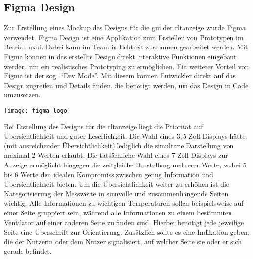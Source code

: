 \subsection{Figma Design}\label{figma_design}
\begin{minipage}{0.6\textwidth}
    Zur Erstellung eines Mockup des Designs für die \acs{gui} der \acs{rltanzeige} wurde Figma verwendet. Figma Design ist eine Applikation zum Erstellen von Prototypen im Bereich \ac{uxui}. Dabei kann im Team in Echtzeit zusammen gearbeitet werden. Mit Figma können in das erstellte Design direkt interaktive Funktionen eingebaut werden, um ein realistisches Prototyping zu ermöglichen. Ein weiterer Vorteil von Figma ist der sog. \enquote{Dev Mode}. Mit diesem können Entwickler direkt auf das Design zugreifen und Details finden, die benötigt werden, um das Design in Code umzusetzen. \cite[vgl.][]{figma_design:o.J.}
\end{minipage}%
\hfill
\begin{minipage}{0.37\textwidth}
	\centering	
	\texttt{[image: figma\_logo]}
\end{minipage}
\vspace{1ex}

Bei Erstellung des Designs für die \acs{rltanzeige} liegt die Priorität auf Übersichtlichkeit und guter Leserlichkeit. Die Wahl eines $3,5$ Zoll Displays hätte (mit ausreichender Übersichtlichkeit) lediglich die simultane Darstellung von maximal $2$ Werten erlaubt. Die tatsächliche Wahl eines $7$ Zoll Displays zur Anzeige ermöglicht hingegen die zeitgleiche Darstellung mehrerer Werte, wobei $5$ bis $6$ Werte den idealen Kompromiss zwischen genug Information und Übersichtlichkeit bieten. Um die Übersichtlichkeit weiter zu erhöhen ist die Kategorisierung der Messwerte in sinnvolle und zusammenhängende Seiten wichtig. Alle Informationen zu wichtigen Temperaturen sollen beispielsweise auf einer Seite gruppiert sein, während alle Informationen zu einem bestimmten Ventilator auf einer anderen Seite zu finden sind. Hierbei benötigt jede jeweilige Seite eine Überschrift zur Orientierung. Zusätzlich sollte es eine Indikation geben, die der Nutzerin oder dem Nutzer signalisiert, auf welcher Seite sie oder er sich gerade befindet.


